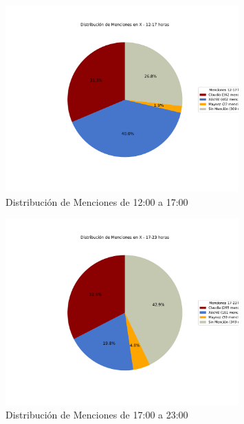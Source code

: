 \documentclass[10pt, a4paper]{article}
\begin{document}
	\begin{figure}[h!]
		\centering
		\includegraphics[width=0.8\textwidth]{grafica_intervalo_12-17.pdf} %
		\vspace{-15mm}
		\caption{Distribución de Menciones de 12:00 a 17:00}
		\label{fig:xIntervalo1217} %
	\end{figure}

	\begin{figure}[h!]
		\centering
		\includegraphics[width=0.8\textwidth]{grafica_intervalo_17-23.pdf} %
		\vspace{-15mm}
		\caption{Distribución de Menciones de 17:00 a 23:00}
		\label{fig:xIntervalo1723} %
	\end{figure}
	
\end{document}
